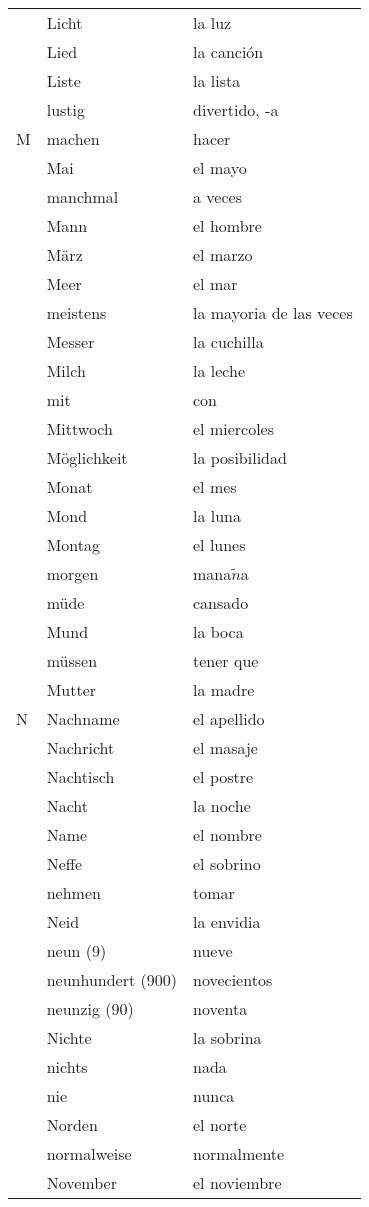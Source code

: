 \documentclass[10pt,spanish]{article}
\begin{document}
\begin{longtable}{p{} p{} | p{}}
& Licht & la luz \\
& Lied & la canción \\
& Liste & la lista \\
& lustig & divertido, -a\\
M & machen & hacer  \\
& Mai & el mayo  \\
& manchmal & a veces  \\
& Mann & el hombre  \\
& März & el marzo  \\
& Meer & el mar  \\
& meistens & la mayoria de las veces  \\
& Messer & la cuchilla  \\
& Milch & la leche  \\
& mit & con  \\
& Mittwoch & el miercoles  \\
& Möglichkeit & la posibilidad  \\
& Monat & el mes  \\
& Mond & la luna  \\
& Montag & el lunes  \\
& morgen & mana$\tilde{n}$a \\
& müde & cansado  \\
& Mund & la boca  \\
& müssen & tener que \\
& Mutter & la madre  \\
N & Nachname & el apellido  \\
& Nachricht & el masaje  \\
& Nachtisch & el postre  \\
& Nacht & la noche  \\
& Name & el nombre  \\
& Neffe & el sobrino  \\
& nehmen & tomar  \\
& Neid & la envidia \\
& neun (9) & nueve  \\
& neunhundert (900) & novecientos  \\
& neunzig (90) & noventa  \\
& Nichte & la sobrina  \\
& nichts & nada \\
& nie & nunca  \\
& Norden & el norte  \\
& normalweise & normalmente \\
& November & el noviembre  \\

\end{longtable}
\end{document}
